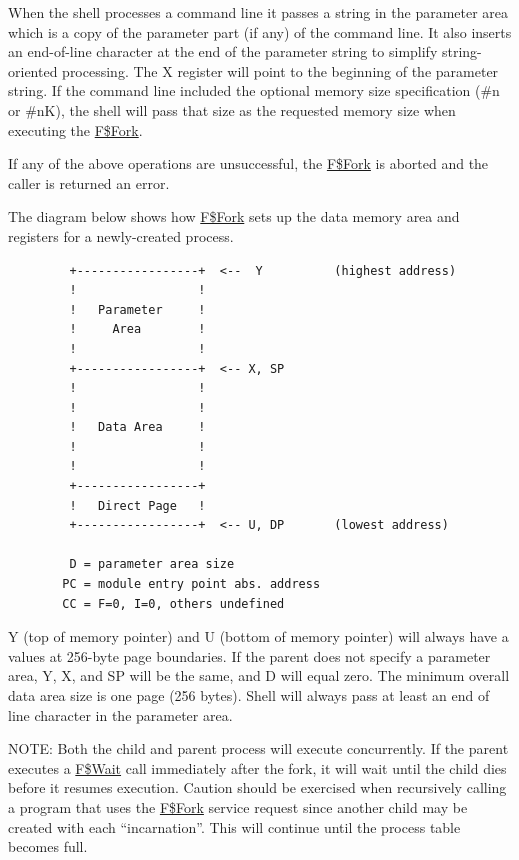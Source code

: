 \documentclass[
]{article}
\begin{document}
When the shell processes a command line it passes a string in the
parameter area which is a copy of the parameter part (if any) of the
command line. It also inserts an end-of-line character at the end of the
parameter string to simplify string-oriented processing. The X register
will point to the beginning of the parameter string. If the command line
included the optional memory size specification (\#n or \#nK), the shell
will pass that size as the requested memory size when executing the
\hyperref[f.fork]{F\$Fork}.

If any of the above operations are unsuccessful, the
\hyperref[f.fork]{F\$Fork} is aborted and the caller is returned an
error.

The diagram below shows how \hyperref[f.fork]{F\$Fork} sets up the data
memory area and registers for a newly-created process.

\begin{figure}
\centering
\begin{verbatim}
   +-----------------+  <--  Y          (highest address)
   !                 !
   !   Parameter     !
   !     Area        !
   !                 !
   +-----------------+  <-- X, SP
   !                 !
   !                 !
   !   Data Area     !
   !                 !
   !                 !
   +-----------------+
   !   Direct Page   !
   +-----------------+  <-- U, DP       (lowest address)

   D = parameter area size
  PC = module entry point abs. address
  CC = F=0, I=0, others undefined
\end{verbatim}
\caption{}
\end{figure}

Y (top of memory pointer) and U (bottom of memory pointer) will always
have a values at 256-byte page boundaries. If the parent does not
specify a parameter area, Y, X, and SP will be the same, and D will
equal zero. The minimum overall data area size is one page (256 bytes).
Shell will always pass at least an end of line character in the
parameter area.

NOTE: Both the child and parent process will execute concurrently. If
the parent executes a \hyperref[f.wait]{F\$Wait} call immediately after
the fork, it will wait until the child dies before it resumes execution.
Caution should be exercised when recursively calling a program that uses
the \hyperref[f.fork]{F\$Fork} service request since another child may
be created with each ``incarnation''. This will continue until the
process table becomes full.
\end{document}
